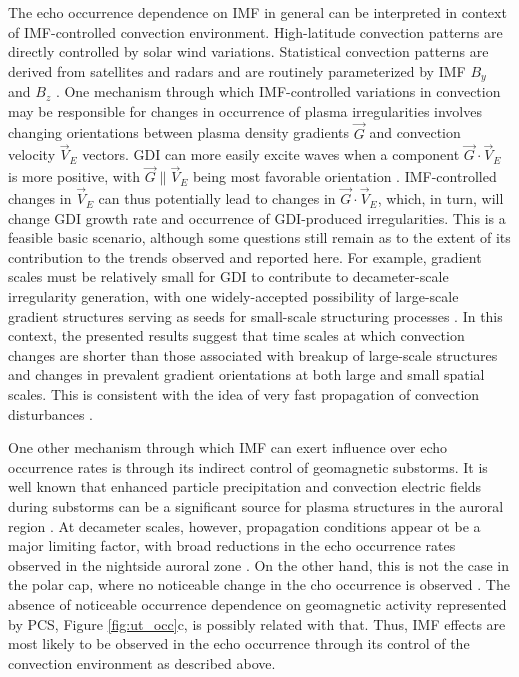 The echo occurrence dependence on IMF in general can be interpreted in context of IMF-controlled convection environment. High-latitude convection patterns are directly controlled by solar wind variations. Statistical convection patterns are derived from satellites and radars and are routinely parameterized by IMF \(B_y\) and \(B_z\) \citep{Haaland2007, Pettigrew2010}. One mechanism through which IMF-controlled variations in convection may be responsible for changes in occurrence of plasma irregularities involves changing orientations between plasma density gradients \(\vec{G}\) and convection velocity \(\vec{V}_E\) vectors. GDI can more easily excite waves when a component \(\vec{G}\cdot\vec{V}_E\) is more positive, with \(\vec{G}\parallel\vec{V}_E\) being most favorable orientation \citep{Keskinen1982a,Makarevich2014c}. IMF-controlled changes in \(\vec{V}_E\) can thus potentially lead to changes in \(\vec{G}\cdot\vec{V}_E\), which, in turn, will change GDI growth rate and occurrence of GDI-produced irregularities. This is a feasible basic scenario, although some questions still remain as to the extent of its contribution to the trends observed and reported here. For example, gradient scales must be relatively small for GDI to contribute to decameter-scale irregularity generation, with one widely-accepted possibility of large-scale gradient structures serving as seeds for small-scale structuring processes \citep{Tsunoda1988}. In this context, the presented results suggest that time scales at which convection changes are shorter than those associated with breakup of large-scale structures and changes in prevalent gradient orientations at both large and small spatial scales. This is consistent with the idea of very fast propagation of convection disturbances \citep{Ridley1998,Ruohoniemi2002,Fiori2012,Taguchi2015}.

One other mechanism through which IMF can exert influence over echo occurrence rates is through its indirect control of geomagnetic substorms.  It is well known that enhanced particle precipitation and convection electric fields during substorms can be a significant source for plasma structures in the auroral region \citep[e.g.][]{Tsunoda1988}.  At decameter scales, however, propagation conditions appear ot be a major limiting factor, with broad reductions in the echo occurrence rates observed in the nightside auroral zone \citep{Wild2008}.  On the other hand, this is not the case in the polar cap, where no noticeable change in the cho occurrence is observed \citep[Figures 1 and 2]{Wild2008}.  The absence of noticeable occurrence dependence on geomagnetic activity represented by PCS, Figure \ref{fig:ut_occ}c, is possibly related with that.  Thus, IMF effects are most likely to be observed in the echo occurrence through its control of the convection environment as described above.



